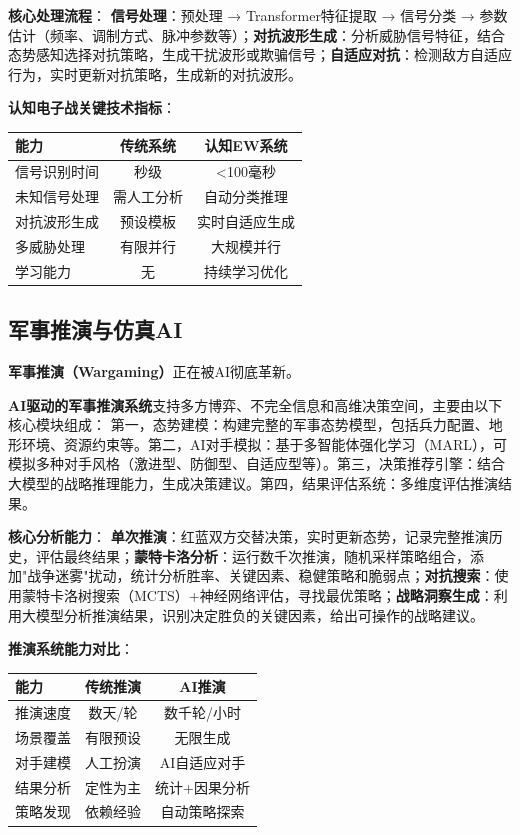 \textbf{核心处理流程}：
\textbf{信号处理}：预处理 → Transformer特征提取 → 信号分类 → 参数估计（频率、调制方式、脉冲参数等）；\textbf{对抗波形生成}：分析威胁信号特征，结合态势感知选择对抗策略，生成干扰波形或欺骗信号；\textbf{自适应对抗}：检测敌方自适应行为，实时更新对抗策略，生成新的对抗波形。

\textbf{认知电子战关键技术指标}：

\begin{center}
\begin{tabular}{lcc}
\toprule
\textbf{能力} & \textbf{传统系统} & \textbf{认知EW系统} \\
\midrule
信号识别时间 & 秒级 & <100毫秒 \\
未知信号处理 & 需人工分析 & 自动分类推理 \\
对抗波形生成 & 预设模板 & 实时自适应生成 \\
多威胁处理 & 有限并行 & 大规模并行 \\
学习能力 & 无 & 持续学习优化 \\
\bottomrule
\end{tabular}
\end{center}

\subsection{军事推演与仿真AI}

\textbf{军事推演（Wargaming）}正在被AI彻底革新。

\textbf{AI驱动的军事推演系统}支持多方博弈、不完全信息和高维决策空间，主要由以下核心模块组成：
第一，态势建模：构建完整的军事态势模型，包括兵力配置、地形环境、资源约束等。第二，AI对手模拟：基于多智能体强化学习（MARL），可模拟多种对手风格（激进型、防御型、自适应型等）。第三，决策推荐引擎：结合大模型的战略推理能力，生成决策建议。第四，结果评估系统：多维度评估推演结果。

\textbf{核心分析能力}：
\textbf{单次推演}：红蓝双方交替决策，实时更新态势，记录完整推演历史，评估最终结果；\textbf{蒙特卡洛分析}：运行数千次推演，随机采样策略组合，添加"战争迷雾"扰动，统计分析胜率、关键因素、稳健策略和脆弱点；\textbf{对抗搜索}：使用蒙特卡洛树搜索（MCTS）+神经网络评估，寻找最优策略；\textbf{战略洞察生成}：利用大模型分析推演结果，识别决定胜负的关键因素，给出可操作的战略建议。

\textbf{推演系统能力对比}：

\begin{center}
\begin{tabular}{p{4cm}cc}
\toprule
\textbf{能力} & \textbf{传统推演} & \textbf{AI推演} \\
\midrule
推演速度 & 数天/轮 & 数千轮/小时 \\
场景覆盖 & 有限预设 & 无限生成 \\
对手建模 & 人工扮演 & AI自适应对手 \\
结果分析 & 定性为主 & 统计+因果分析 \\
策略发现 & 依赖经验 & 自动策略探索 \\
\bottomrule
\end{tabular}
\end{center}

